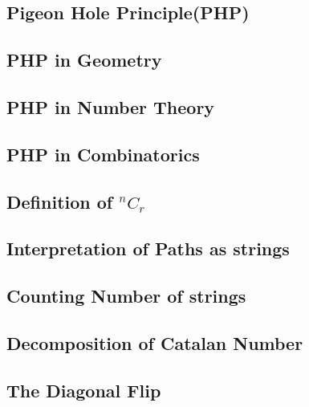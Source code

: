 \documentclass[9pt]{beamer}
\begin{document}
\Front
\overview
% 
% 

\subsection{Pigeon Hole Principle(PHP)}

\subsection{PHP in Geometry}

\subsection{PHP in Number Theory}

\subsection{PHP in Combinatorics}


\subsection{Definition of $^nC_r$}

\subsection{Interpretation of Paths as strings}

\subsection{Counting Number of strings}


\subsection{Decomposition of Catalan Number}

\subsection{The Diagonal Flip}


\end{document}
